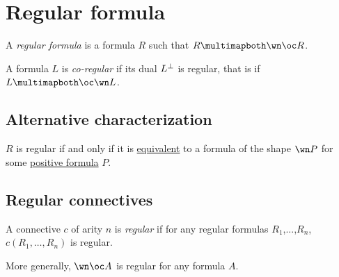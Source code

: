 \section{Regular formula}\label{regular-formula}

A \emph{regular formula} is a formula \(R\) such that
\(R\linequiv\wn\oc R\).

A formula \(L\) is \emph{co-regular} if its dual \(L^\bot\) is regular,
that is if \(L\linequiv\oc\wn L\).

\subsection{Alternative
characterization}\label{alternative-characterization}

\(R\) is regular if and only if it is
\href{Sequent_calculus\#Equivalences}{equivalent} to a formula of the
shape \(\wn P\) for some \href{positive_formula}{positive formula}
\(P\).

\subsection{Regular connectives}\label{regular-connectives}

A connective \(c\) of arity \(n\) is \emph{regular} if for any regular
formulas \(R_1\),...,\(R_n\), \(c(R_1,\dots,R_n)\) is regular.

More generally, \(\wn\oc A\) is regular for any formula \(A\).


